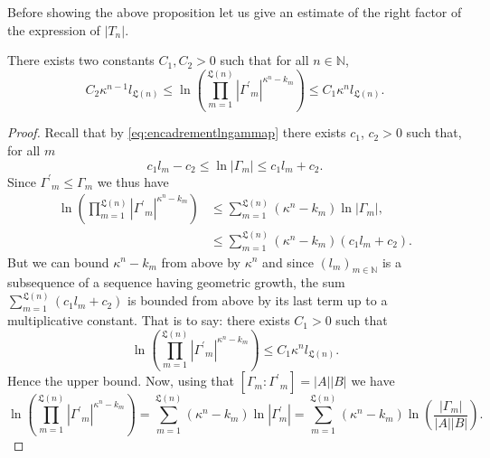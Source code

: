 \documentclass[english, 11pt, a4paper]{article}
\theoremstyle{definition}
\numberwithin{equation}{section}
\newcommand{\bN}{\mathbb{N}}
\newcommand{\Gsp}{{\Gamma^\prime}_m}
\newcommand{\Landing}{\mathfrak{L}}
\begin{document}
Before showing the above proposition let us give an estimate of the right
factor of the expression of $|T_n|$.
 
\begin{Lmm}\label{Lmm:EncadrementLogGp}
  There exists two constants $C_1, C_2>0$ 
  such that for all $n \in \bN$,
  \begin{equation*}
    C_2 \kappa^{n-1} l_{\Landing(n)}
    \leq \ln \left(
      \prod^{\Landing(n)}_{m=1} {\left\vert {\Gamma^\prime}_m \right\vert}^{\kappa^n-k_m} \right)
    \leq C_1\kappa^n l_{\Landing(n)}.
  \end{equation*}
\end{Lmm}

\begin{proof}
  Recall that by \cref{eq:encadrementlngammap} there exists $c_1$, $c_2>0$ such that, for all $m$
  \begin{equation*}
    c_1 l_m -c_2 \leq \ln \left\vert {\Gamma_m}\right\vert \leq c_1l_m + c_2.
  \end{equation*}
  Since $\Gsp \leq \Gamma_m$ we thus have
  \begin{align*}
    \ln \left(
    \prod^{\Landing(n)}_{m=1} {\left\vert {\Gamma^\prime}_m \right\vert}^{\kappa^n-k_m} \right)
    &\leq \sum^{\Landing(n)}_{m=1} \left({\kappa^n-k_m}\right) \ln |\Gamma_m |,\\
    &\leq \sum^{\Landing(n)}_{m=1} \left({\kappa^n-k_m}\right)\left( c_1l_m+c_2 \right).%
  \end{align*}
  But we can bound $\kappa^n-k_m$ from above by $\kappa^n$ and since
  $(l_m)_{m\in \bN}$ is a subsequence of a sequence having geometric growth, the sum 
  $\sum^{\Landing(n)}_{m=1} \left( c_1l_m+c_2 \right)$ is bounded from above by
  its last term up to a multiplicative constant. That is to say: there exists
  $C_1>0$ such that  
  \begin{equation*}
   \ln \left(
     \prod^{\Landing(n)}_{m=1} {\left\vert {\Gamma^\prime}_m \right\vert}^{\kappa^n-k_m} \right)
   \leq C_1\kappa^n l_{\Landing(n)}.
  \end{equation*}
  Hence the upper bound.
  Now, using that $[\Gamma_m:\Gsp]=|A||B|$ we have
  \begin{equation*}
    \ln \left(
    \prod^{\Landing(n)}_{m=1} {\left\vert {\Gamma^\prime}_m \right\vert}^{\kappa^n-k_m} \right)
    = \sum^{\Landing(n)}_{m=1} \left({\kappa^n-k_m}\right)
    \ln|\Gamma^\prime_m|
    = \sum^{\Landing(n)}_{m=1} \left({\kappa^n-k_m}\right)
    \ln \left(\frac{|\Gamma_{m} |}{|A||B|}\right). 

\end{equation*}
\end{proof}
\end{document}
